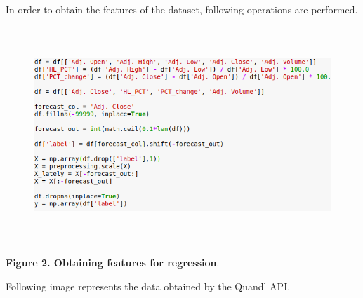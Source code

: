 \documentclass[12pt]{article}
\begin{document}
\vspace{\baselineskip}
In order to obtain the features of the dataset, following operations are performed.\par


\vspace{\baselineskip}



\begin{figure}[H]
	\begin{Center}
		\includegraphics[width=6.27in,height=3.22in]{./media/image7.png}
	\end{Center}
\end{figure}



\par

\begin{Center}
\textbf{Figure 2. Obtaining features for regression}.
\end{Center}\par


\vspace{\baselineskip}
Following image represents the data obtained by the Quandl API.\par


\vspace{\baselineskip}


\end{document}
